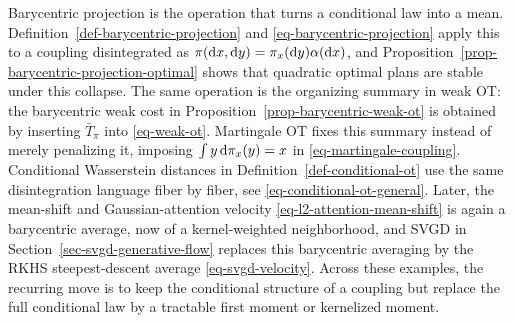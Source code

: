 \begin{rem}\label{rem-barycentric-projection-everywhere}
	Barycentric projection is the operation that turns a conditional law into a mean. Definition~\ref{def-barycentric-projection} and \eqref{eq-barycentric-projection} apply this to a coupling disintegrated as \(\pi(\mathrm{d} x,\mathrm{d} y)=\pi_x(\mathrm{d} y)\alpha(\mathrm{d} x)\), and Proposition~\ref{prop-barycentric-projection-optimal} shows that quadratic optimal plans are stable under this collapse. The same operation is the organizing summary in weak OT: the barycentric weak cost in Proposition~\ref{prop-barycentric-weak-ot} is obtained by inserting \(\bar T_\pi\) into \eqref{eq-weak-ot}. Martingale OT fixes this summary instead of merely penalizing it, imposing \(\int y\,\mathrm{d}\pi_x(y)=x\) in \eqref{eq-martingale-coupling}. Conditional Wasserstein distances in Definition~\ref{def-conditional-ot} use the same disintegration language fiber by fiber, see \eqref{eq-conditional-ot-general}. Later, the mean-shift and Gaussian-attention velocity \eqref{eq-l2-attention-mean-shift} is again a barycentric average, now of a kernel-weighted neighborhood, and SVGD in Section~\ref{sec-svgd-generative-flow} replaces this barycentric averaging by the RKHS steepest-descent average \eqref{eq-svgd-velocity}. Across these examples, the recurring move is to keep the conditional structure of a coupling but replace the full conditional law by a tractable first moment or kernelized moment.
\end{rem}

